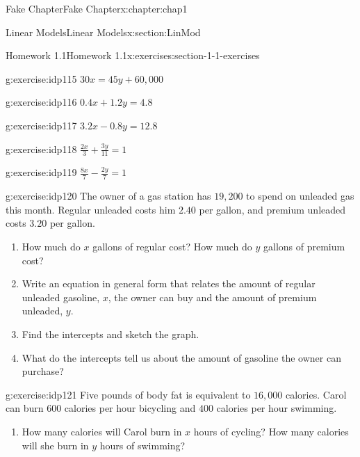 \documentclass[oneside,10pt,]{book}
\numberwithin{equation}{section}
\begin{document}
\begin{chapterptx}{Fake Chapter}{}{Fake Chapter}{}{}{x:chapter:chap1}
\begin{sectionptx}{Linear Models}{}{Linear Models}{}{}{x:section:LinMod}
\begin{exercises-subsection}{Homework 1.1}{}{Homework 1.1}{}{}{x:exercises:section-1-1-exercises}
\begin{exercisegroupcol}{2}
\begin{divisionexerciseegcol}{20}{}{}{g:exercise:idp115}%
\(30x = 45y + 60,000\)%
\end{divisionexerciseegcol}%
\begin{divisionexerciseegcol}{21}{}{}{g:exercise:idp116}%
\(0.4x + 1.2y = 4.8\)%
\end{divisionexerciseegcol}%
\begin{divisionexerciseegcol}{22}{}{}{g:exercise:idp117}%
\(3.2x - 0.8y = 12.8\)%
\end{divisionexerciseegcol}%
\begin{divisionexerciseegcol}{23}{}{}{g:exercise:idp118}%
\(\displaystyle{\frac{2x}{3}+ \frac{3y}{11}= 1}\)%
\end{divisionexerciseegcol}%
\begin{divisionexerciseegcol}{24}{}{}{g:exercise:idp119}%
\(\displaystyle{\frac{8x}{7}- \frac{2y}{7}= 1}\)%
\end{divisionexerciseegcol}%
\end{exercisegroupcol}
\par\medskip\noindent
\begin{divisionexercise}{25}{}{}{g:exercise:idp120}%
The owner of a gas station has \textdollar{}\(19,200\) to spend on unleaded gas this month. Regular unleaded costs him \textdollar{}\(2.40\) per gallon, and premium unleaded costs \textdollar{}\(3.20\) per gallon.%
%
\begin{enumerate}[label=\alph*]
\item{}How much do \(x\) gallons of regular cost? How much do \(y\) gallons of premium cost?%
\item{}Write an equation in general form that relates the amount of regular unleaded gasoline, \(x\), the owner can buy and the amount of premium unleaded, \(y\).%
\item{}Find the intercepts and sketch the graph.%
\item{}What do the intercepts tell us about the amount of gasoline the owner can purchase?%
\end{enumerate}
\end{divisionexercise}%
\begin{divisionexercise}{26}{}{}{g:exercise:idp121}%
Five pounds of body fat is equivalent to \(16,000\) calories. Carol can burn \(600\) calories per hour bicycling and \(400\) calories per hour swimming.%
%
\begin{enumerate}[label=\alph*]
\item{}How many calories will Carol burn in \(x\) hours of cycling? How many calories will she burn in \(y\) hours of swimming?%

\end{enumerate}
\end{divisionexercise}
\end{exercises-subsection}
\end{sectionptx}
\end{chapterptx}
\end{document}
